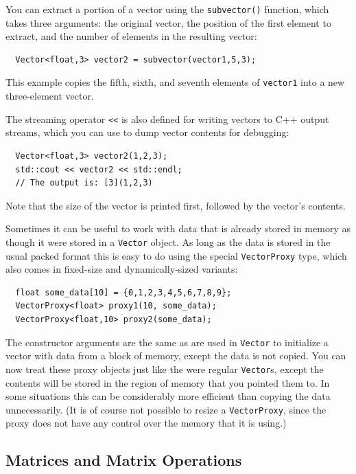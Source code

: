 You can extract a portion of a vector using the \verb#subvector()#
function, which takes three arguments: the original vector, the
position of the first element to extract, and the number of elements
in the resulting vector:
\begin{verbatim}
  Vector<float,3> vector2 = subvector(vector1,5,3);
\end{verbatim}
This example copies the fifth, sixth, and seventh elements of
\verb#vector1# into a new three-element vector.

The streaming operator \verb#<<# is also defined for writing vectors
to C++ output streams, which you can use to dump vector contents for
debugging:
\begin{verbatim}
  Vector<float,3> vector2(1,2,3);
  std::cout << vector2 << std::endl;
  // The output is: [3](1,2,3)
\end{verbatim}
Note that the size of the vector is printed first, followed by the 
vector's contents.

Sometimes it can be useful to work with data that is already stored in 
memory as though it were stored in a \verb#Vector# object.  As long as 
the data is stored in the usual packed format this is easy to do using 
the special \verb#VectorProxy# type, which also comes in fixed-size 
and dynamically-sized variants:
\begin{verbatim}
  float some_data[10] = {0,1,2,3,4,5,6,7,8,9};
  VectorProxy<float> proxy1(10, some_data);
  VectorProxy<float,10> proxy2(some_data);
\end{verbatim}
The constructor arguments are the same as are used in \verb#Vector# to
initialize a vector with data from a block of memory, except the data
is not copied.  You can now treat these proxy objects just like the
were regular \verb#Vector#s, except the contents will be stored in the
region of memory that you pointed them to.  In some situations this
can be considerably more efficient than copying the data
unnecessarily. (It is of course not possible to resize a
\verb#VectorProxy#, since the proxy does not have any control over the
memory that it is using.)

\subsection{Matrices and Matrix Operations}


